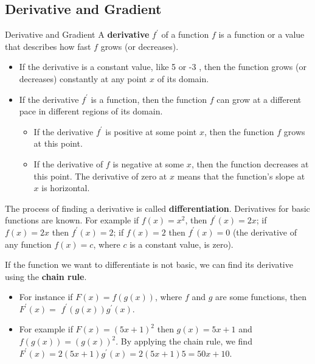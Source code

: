 \documentclass[9pt,dvipsnames]{beamer}
\begin{document}
\subsection{Derivative and Gradient}
\begin{frame}{Derivative and Gradient}
	A \textbf{derivative} $f^{\prime}$ of a function $f$ is a function or a value that describes how fast $f$ grows (or decreases).
	\begin{itemize}
		\item If the derivative is a constant value, like 5 or -3 , then the function grows (or decreases) constantly at any point $x$ of its domain.
		\item If the derivative $f^{\prime}$ is a function, then the function $f$ can grow at a different pace in different regions of its domain.
		      \begin{itemize}
			      \item If the derivative $f^{\prime}$ is positive at some point $x$, then the function $f$ grows at this point.
			      \item If the derivative of $f$ is negative at some $x$, then the function decreases at this point. The derivative of zero at $x$ means that the function's slope at $x$ is horizontal.
		      \end{itemize}
	\end{itemize}
	The process of finding a derivative is called \textbf{differentiation}. Derivatives for basic functions are known. For example if $f(x)=x^{2}$, then $f^{\prime}(x)=2 x$; if $f(x)=2 x$ then $f^{\prime}(x)=2$; if $f(x)=2$ then $f^{\prime}(x)=0$ (the derivative of any function $f(x)=c$, where $c$ is a constant value, is zero).
\end{frame}

\begin{frame}
	If the function we want to differentiate is not basic, we can find its derivative using the \textbf{chain rule}.
	\begin{itemize}
		\item For instance if $F(x)=f(g(x))$, where $f$ and $g$ are some functions, then $F^{\prime}(x)=$ $f^{\prime}(g(x)) g^{\prime}(x)$.
		\item For example if $F(x)=(5 x+1)^{2}$ then $g(x)=5 x+1$ and $f(g(x))=(g(x))^{2}$. By applying the chain rule, we find $F^{\prime}(x)=2(5 x+1) g^{\prime}(x)=2(5 x+1) 5=50 x+10$.
	\end{itemize}
\end{frame}
\end{document}
